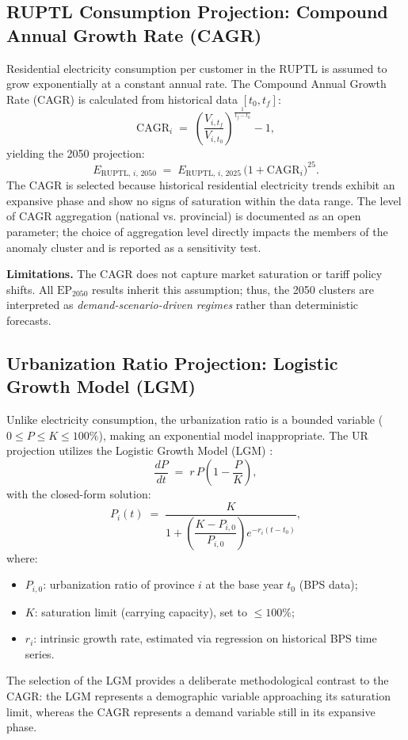 \documentclass[11pt,a4paper]{article}
\begin{document}
\subsection{RUPTL Consumption Projection: Compound Annual Growth Rate (CAGR)}
Residential electricity consumption per customer in the RUPTL is assumed to grow exponentially at a constant annual rate. The Compound Annual Growth Rate (CAGR) is calculated from historical data $[t_0, t_f]$:
\begin{equation}
\mathrm{CAGR}_i \;=\; \left(\frac{V_{i,t_f}}{V_{i,t_0}}\right)^{\!\frac{1}{t_f - t_0}} - 1,
\label{eq:cagr}
\end{equation}
yielding the 2050 projection:
\begin{equation}
E_{\mathrm{RUPTL},\,i,\,2050} \;=\; E_{\mathrm{RUPTL},\,i,\,2025}\,\bigl(1+\mathrm{CAGR}_i\bigr)^{25}.
\label{eq:proj-ruptl}
\end{equation}
The CAGR is selected because historical residential electricity trends exhibit an expansive phase and show no signs of saturation within the data range. The level of CAGR aggregation (national vs. provincial) is documented as an open parameter; the choice of aggregation level directly impacts the members of the anomaly cluster and is reported as a sensitivity test.

\textbf{Limitations.} The CAGR does not capture market saturation or tariff policy shifts. All $\mathrm{EP}_{2050}$ results inherit this assumption; thus, the 2050 clusters are interpreted as \emph{demand-scenario-driven regimes} rather than deterministic forecasts.

\subsection{Urbanization Ratio Projection: Logistic Growth Model (LGM)}
Unlike electricity consumption, the urbanization ratio is a bounded variable ($0 \le P \le K \le 100\%$), making an exponential model inappropriate. The UR projection utilizes the Logistic Growth Model (LGM) \cite{verhulst1838}:
\begin{equation}
\frac{dP}{dt} \;=\; r\,P\!\left(1 - \frac{P}{K}\right),
\label{eq:lgm-ode}
\end{equation}
with the closed-form solution:
\begin{equation}
P_i(t) \;=\; \frac{K}{1 + \left(\dfrac{K - P_{i,0}}{P_{i,0}}\right) e^{-r_i (t - t_0)}},
\label{eq:lgm-closed}
\end{equation}
where:
\begin{itemize}[nosep]
\item $P_{i,0}$: urbanization ratio of province $i$ at the base year $t_0$ (BPS data);
\item $K$: saturation limit (carrying capacity), set to $\le 100\%$;
\item $r_i$: intrinsic growth rate, estimated via regression on historical BPS time series.
\end{itemize}
The selection of the LGM provides a deliberate methodological contrast to the CAGR: the LGM represents a demographic variable approaching its saturation limit, whereas the CAGR represents a demand variable still in its expansive phase.
\end{document}
